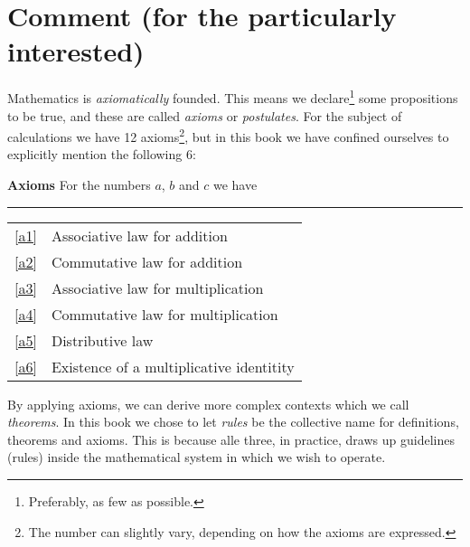 



	
\section*{Comment (for the particularly interested) \label{Kommentar1}}
Mathematics is \textit{axiomatically} founded. This means we declare\footnote{Preferably, as few as possible.} some propositions to be true, and these are called \textit{axioms} or \textit{postulates}. For the subject of calculations we have 12 axioms\footnote{The number can slightly vary, depending on how the axioms are expressed.}, but in this book we have confined ourselves to explicitly mention the following 6:
\regv 

\begin{tcolorbox}[boxrule=0.3 mm,arc=0mm,colback=blue!5] {\large \textbf{Axioms} \vspace{5 pt}}\newline
For the numbers $ a $, $ b $ and $ c $ we have
\rule{1\linewidth}{0.75bp}
\begin{center}
	\begin{tabular}{rl}
		\eqref{a1} &Associative law for addition\\
		\eqref{a2} & Commutative law for addition \\	
		\eqref{a3} & Associative law for multiplication \\
		\eqref{a4} & Commutative law for multiplication \\		
		\eqref{a5} & Distributive law\\	
		\eqref{a6} & Existence of a multiplicative identitity
	\end{tabular}
\end{center}
\end{tcolorbox}
\vsk
By applying axioms, we can derive more complex contexts which we call \textit{theorems}. In this book we chose to let \textsl{rules} be the collective name for definitions, theorems and axioms. This is because alle three, in practice, draws up guidelines (rules) inside the mathematical system in which we wish to operate.\vsk
